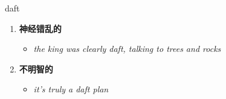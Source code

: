 
\begin{frame}
{\huge daft}
\begin{center}
\begin{enumerate}\Large
  \item \textbf{神经错乱的}
  \begin{itemize}
    \item \em{\Large{the king was clearly daft, talking to trees and rocks}}
  \end{itemize}
  \item \textbf{不明智的}
  \begin{itemize}
    \item \em{\Large{it's truly a daft plan}}
  \end{itemize}
\end{enumerate}
\end{center}
\end{frame}
